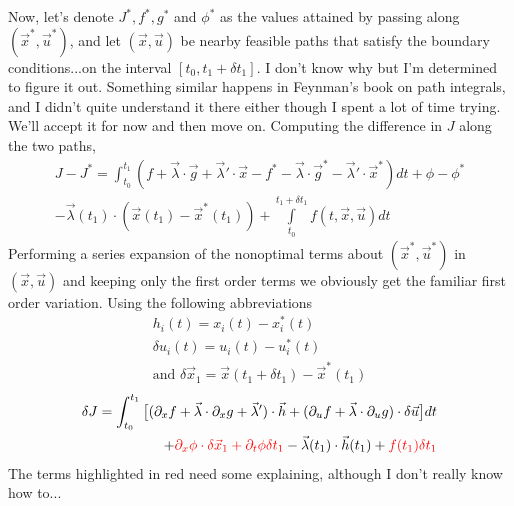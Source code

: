 \documentclass[11pt]{article}
\numberwithin{equation}{section}
\begin{document}
Now, let's denote $J^*, f^*, g^*$ and $\phi^*$ as the values attained by passing along $(\vec{x}^*,\vec{u}^*)$, and let $(\vec{x},\vec{u})$ be nearby feasible paths that satisfy the boundary conditions...on the interval $[t_0,t_1+\delta t_1]$. I don't know why but I'm determined to figure it out. Something similar happens in Feynman's book on path integrals, and I didn't quite understand it there either though I spent a lot of time trying. We'll accept it for now and then move on. Computing the difference in $J$ along the two paths,
\begin{align}
J - J^* = \int_{t_0}^{t_1}(f + \vec{\lambda}\cdot\vec{g} + \vec{\lambda}'\cdot\vec{x} - f^* - \vec{\lambda}\cdot\vec{g}^* - \vec{\lambda}'\cdot\vec{x}^*)dt + \phi - \phi^* \\
- \vec{\lambda}(t_1)\cdot(\vec{x}(t_1) - \vec{x}^*(t_1)) + \int\limits_{t_0}^{t_1+\delta t_1}f(t,\vec{x},\vec{u})dt
\end{align}
Performing a series expansion of the nonoptimal terms about $(\vec{x}^*,\vec{u}^*)$ in $(\vec{x},\vec{u})$ and keeping only the first order terms we obviously get the familiar first order variation. Using the following abbreviations
\begin{align}
h_i(t) = x_i(t) - x_i^*(t) \\
\delta u_i(t) = u_i(t) - u_i^*(t) \\
\text{and } \delta\vec{x}_1 = \vec{x}(t_1 + \delta t_1) - \vec{x}^*(t_1)
\end{align}
\begin{align}
\delta J = \int_{t_0}^{t_1}\big[(\partial_x f + \vec{\lambda}\cdot\partial_x g + \vec{\lambda}')\cdot\vec{h} + (\partial_u f + \vec{\lambda}\cdot\partial_u g)\cdot\delta\vec{u}\big]dt \\
+{\color{red}\partial_x\phi\cdot\delta\vec{x}_1 + \partial_t\phi\delta t_1} - \vec{\lambda}(t_1)\cdot\vec{h}(t_1) + {\color{red}f(t_1)\delta t_1}
\end{align}
The terms highlighted in red need some explaining, although I don't really know how to...
\end{document}
